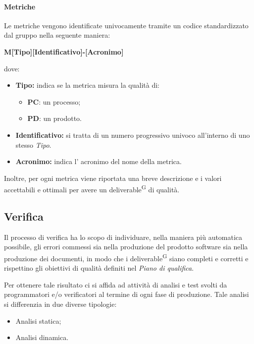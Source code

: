 \paragraph{Metriche}
Le metriche vengono identificate univocamente tramite un codice standardizzato dal gruppo nella seguente maniera:
\begin{center}
    \textbf{M[Tipo][Identificativo]-[Acronimo]}
\end{center}
dove:
\begin{itemize}
    \item \textbf{Tipo:} indica se la metrica misura la qualità di:
        \begin{itemize}
            \item \textbf{PC}: un processo;
            \item \textbf{PD}: un prodotto.
        \end{itemize}                 
    \item \textbf{Identificativo:} si tratta di un numero progressivo univoco all'interno di uno stesso \textit{Tipo}.
    \item \textbf{Acronimo:} indica l' acronimo del nome della metrica.
\end{itemize}
Inoltre, per ogni metrica viene riportata una breve descrizione e i valori accettabili e ottimali per avere un deliverable\textsuperscript{G} di qualità.



\subsection{Verifica}\label{sec:processi_di_supporto:verifica}
Il processo di verifica ha lo scopo di individuare, nella maniera più automatica possibile, gli errori commessi sia nella produzione del prodotto software sia nella produzione dei documenti, in modo che i deliverable\textsuperscript{G} siano completi e corretti e rispettino gli obiettivi di qualità definiti nel \textit{Piano di qualifica}.

Per ottenere tale risultato ci si affida ad attività di analisi e test svolti da programmatori e/o verificatori al termine di ogni fase di produzione. Tale analisi si differenzia in due diverse tipologie:
\begin{itemize}
    \item Analisi statica;
    \item Analisi dinamica.
\end{itemize}

